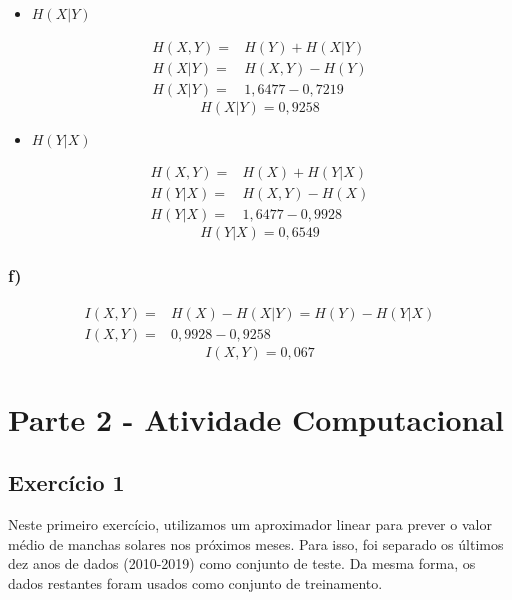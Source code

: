 \documentclass[12pt]{article}
\begin{document}
\begin{itemize}
	\item{\large $H(X|Y)$}
\end{itemize}


\begin{align*}
H(X,Y) =& H(Y) + H(X|Y)\\
H(X|Y) =& H(X,Y) - H(Y)\\
H(X|Y) =& 1,6477 - 0,7219
\end{align*}
\begin{equation*}
\boxed{H(X|Y) = 0,9258}
\end{equation*}

\vspace{2cm}
\begin{itemize}
	\item{\large $H(Y|X)$}
\end{itemize}


\begin{align*}
H(X,Y) =& H(X) + H(Y|X)\\
H(Y|X) =& H(X,Y) - H(X)\\
H(Y|X) =& 1,6477 - 0,9928
\end{align*}
\begin{equation*}
\boxed{H(Y|X) = 0,6549}
\end{equation*}
\vspace{2cm}
\subsubsection*{f)}
\begin{align*}
	I(X,Y) =& H(X) - H(X|Y) = H(Y) - H(Y|X)\\
	I(X,Y) =& 0,9928 - 0,9258 
\end{align*}
\begin{equation*}
	\boxed{I(X,Y) = 0,067}
\end{equation*}
\pagebreak

\section*{Parte 2 - Atividade Computacional}

\subsection*{Exercício 1}

Neste primeiro exercício, utilizamos um aproximador linear para prever o valor médio de manchas solares nos próximos meses. Para isso, foi separado os últimos dez anos de dados (2010-2019) como conjunto de teste. Da mesma forma, os dados restantes foram usados como conjunto de treinamento.
\end{document}

